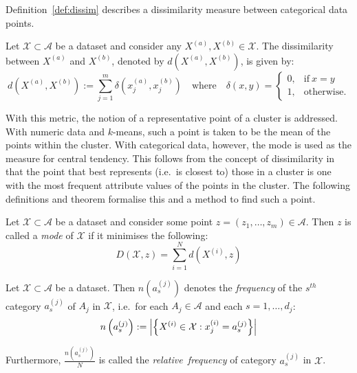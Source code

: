 \documentclass[smallextended]{svjour3}
\DeclarePairedDelimiter\abs{\lvert}{\rvert}%
\begin{document}
Definition~\ref{def:dissim} describes a dissimilarity measure between
categorical data points.

\begin{definition}\label{def:dissim}
    Let \(\mathcal{X} \subset \mathcal A\) be a dataset and consider any
    \(X^{(a)}, X^{(b)} \in \mathcal{X}\). The dissimilarity between \(X^{(a)}\)
    and \(X^{(b)}\), denoted by \(d\left(X^{(a)}, X^{(b)}\right)\), is given by:
    \begin{equation}\label{eq:dissim}
        d\left(X^{(a)}, X^{(b)}\right) := \sum_{j=1}^{m} \delta\left(x_j^{(a)},
        x_j^{(b)}\right) \quad \text{where} \quad \delta\left(x, y\right) =
        \begin{cases}
            0, & \text{if} \ x = y \\
            1, & \text{otherwise.}
        \end{cases}
    \end{equation}
\end{definition}

With this metric, the notion of a representative point of a cluster is
addressed. With numeric data and \(k\)-means, such a point is taken to be the
mean of the points within the cluster. With categorical data, however, the mode
is used as the measure for central tendency. This follows from the concept of
dissimilarity in that the point that best represents (i.e.\ is closest to) those
in a cluster is one with the most frequent attribute values of the points in the
cluster. The following definitions and theorem formalise this and a method to
find such a point.

\begin{definition}\label{def:mode}
    Let \(\mathcal{X} \subset \mathcal{A}\) be a dataset and consider some point
    \(z = \left(z_1, \ldots, z_m\right) \in \mathcal{A}\). Then \(z\) is called
    a \emph{mode} of \(\mathcal{X}\) if it minimises the following:
    \begin{equation}\label{eq:summed-dissim}
        D\left(\mathcal{X}, z\right) = \sum_{i=1}^{N} d\left(X^{(i)}, z\right)
    \end{equation}
\end{definition}

\begin{definition}\label{def:rel-freq}
    Let \(\mathcal{X} \subset \mathcal{A}\) be a dataset. Then
    \(n\left(a_s^{(j)}\right)\) denotes the \emph{frequency} of the \(s^{th}\)
    category \(a_s^{(j)}\) of \(A_j\) in \(\mathcal{X}\), i.e.\ for each \(A_j
    \in \mathcal{A}\) and each \(s = 1, \ldots, d_j\):
    \begin{equation}
        n\left(a_s^{(j)}\right) := \abs*{%
            {\left\{X^{(i)} \in \mathcal{X}: x_j^{(i)} = a_s^{(j)}\right\}}
        }
    \end{equation}
	
    Furthermore, \(\frac{n\left(a_s^{(j)}\right)}{N}\) is called the
    \emph{relative~frequency} of category \(a_s^{(j)}\) in \(\mathcal{X}\).
\end{definition}
\end{document}
